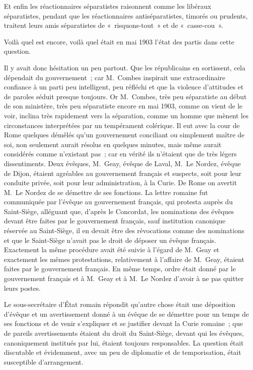 \documentclass[french,twoside]{book} %
\begin{document}
Et enfin les réactionnaires séparatistes raisonnent comme les libéraux séparatistes, pendant que les réactionnaires antiséparatistes, timorés ou prudents, traitent leurs amis séparatistes de « risquons-tout » et de « casse-cou ».\par
Voilà quel est encore, voilà quel était en mai 1903 l’état des partis dans cette question.\par
Il y avait donc hésitation un peu partout. Que les républicains en sortissent, cela dépendait du gouvernement ; car M. Combes inspirait une extraordinaire confiance à un parti peu intelligent, peu réfléchi et que la violence d’attitudes et de paroles séduit presque toujours. Or M. Combes, très peu séparatiste au début de son ministère, très peu séparatiste encore en mai 1903, comme on vient de le voir, inclina très rapidement vers la séparation, comme un homme que mènent les circonstances interprétées par un tempérament colérique. Il eut avec la cour de Rome quelques démêlés qu’un gouvernement conciliant ou simplement maître de soi, non seulement aurait résolus en quelques minutes, mais  même aurait considérés comme n’existant pas ; car en vérité ils n’étaient que de très légers dissentiments. Deux évêques, M. Geay, évêque de Laval, M. Le Nordez, évêque de Dijon, étaient agréables au gouvernement français et suspects, soit pour leur conduite privée, soit pour leur administration, à la Curie. De Rome on avertit M. Le Nordez de se démettre de ses fonctions. La lettre romaine fut communiquée par l’évêque au gouvernement français, qui protesta auprès du Saint-Siège, alléguant que, d’après le Concordat, les nominations des évêques devant être faites par le gouvernement français, sauf institution canonique réservée au Saint-Siège, il en devait être des révocations comme des nominations et que le Saint-Siège n’avait pas le droit de déposer un évêque français. Exactement la même procédure avait été suivie à l’égard de M. Geay et exactement les mêmes protestations, relativement à l’affaire de M. Geay, étaient faites par le gouvernement français. En même temps, ordre était donné par le gouvernement français et à M. Geay et à M. Le Nordez d’avoir à ne pas quitter leurs postes.\par
Le sous-secrétaire d’État romain répondit qu’autre chose était une déposition d’évêque et un avertissement donné à un évêque de se démettre  pour un temps de ses fonctions et de venir s’expliquer et se justifier devant la Curie romaine ; que de pareils avertissements étaient du droit du Saint-Siège, devant qui les évêques, canoniquement institués par lui, étaient toujours responsables. La question était discutable et évidemment, avec un peu de diplomatie et de temporisation, était susceptible d’arrangement.\par
\end{document}
